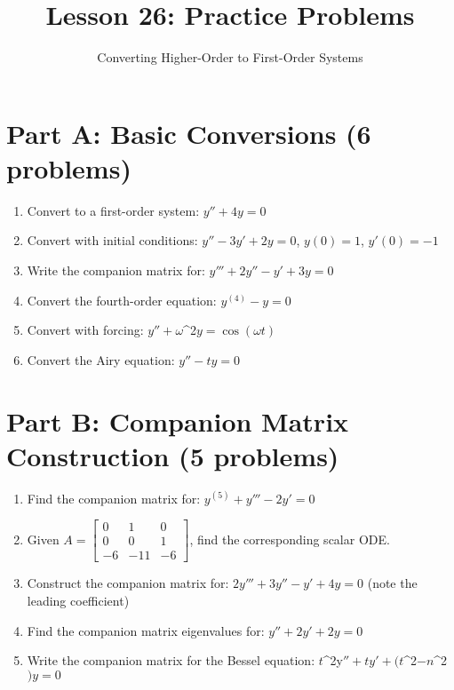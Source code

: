 \documentclass[12pt]{article}
\title{Lesson 26: Practice Problems}
\author{Converting Higher-Order to First-Order Systems}
\date{}
\begin{document}
\maketitle

\section*{Part A: Basic Conversions (6 problems)}

\begin{enumerate}
\item Convert to a first-order system: $y'' + 4y = 0$

\item Convert with initial conditions: $y'' - 3y' + 2y = 0$, $y(0) = 1$, $y'(0) = -1$

\item Write the companion matrix for: $y''' + 2y'' - y' + 3y = 0$

\item Convert the fourth-order equation: $y^{(4)} - y = 0$

\item Convert with forcing: $y'' + \omega$^{2}$ y = \cos(\omega t)$

\item Convert the Airy equation: $y'' - ty = 0$
\end{enumerate}

\section*{Part B: Companion Matrix Construction (5 problems)}

\begin{enumerate}[resume]
\item Find the companion matrix for: $y^{(5)} + y''' - 2y' = 0$

\item Given $A = \begin{bmatrix} 0 & 1 & 0 \\ 0 & 0 & 1 \\ -6 & -11 & -6 \end{bmatrix}$, find the corresponding scalar ODE.

\item Construct the companion matrix for: $2y''' + 3y'' - y' + 4y = 0$ (note the leading coefficient)

\item Find the companion matrix eigenvalues for: $y'' + 2y' + 2y = 0$

\item Write the companion matrix for the Bessel equation: $t$^{2y}$'' + ty' + (t$^{2}$ - n$^{2}$)y = 0$
\end{enumerate}
\end{document}

